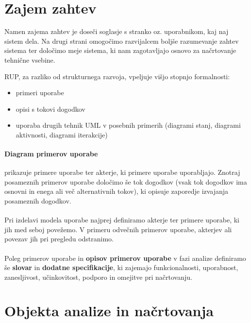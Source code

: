 \documentclass[a4paper,12pt]{report}
\begin{document}
      \section{Zajem zahtev}
      Namen zajema zahtev je doseči soglasje s stranko oz. uporabnikom, kaj naj sistem dela. Na drugi strani omogočimo
      razvijalcem boljše razumevanje zahtev sistema ter določimo meje sistema, ki nam zagotavljajo osnovo za načrtovanje tehnične vsebine.

      RUP, za razliko od strukturnega razvoja, vpeljuje višjo stopnjo formalnosti:
      \begin{itemize}
         \item primeri uporabe
         \item opisi s tokovi dogodkov
         \item uporaba drugih tehnik UML v posebnih primerih (diagrami stanj, diagrami aktivnosti, diagrami iterakcije)
      \end{itemize}

      \paragraph{Diagram primerov uporabe} prikazuje primere uporabe ter akterje, ki primere uporabe uporabljajo.
      Znotraj posameznih primerov uporabe določimo še tok dogodkov (vsak tok dogodkov ima osnovni in enega ali več alternativnih tokov),
      ki opisuje zaporedje izvajanja posameznih dogodkov.
      \\\\
      Pri izdelavi modela uporabe najprej definiramo akterje ter primere uporabe, ki jih med seboj povežemo. V primeru odvečnih
      primerov uporabe, akterjev ali povezav jih pri pregledu odstranimo.
      \\\\
      Poleg primerov uporabe in \textbf{opisov primerov uporabe} v fazi analize definiramo še \textbf{slovar} in \textbf{dodatne specifikacije}, 
      ki zajemajo funkcionalnosti, uporabnost, zanesljivost, učinkovitost, podporo in omejitve pri načrtovanju.

      \section{Objekta analize in načrtovanja}
\end{document}
